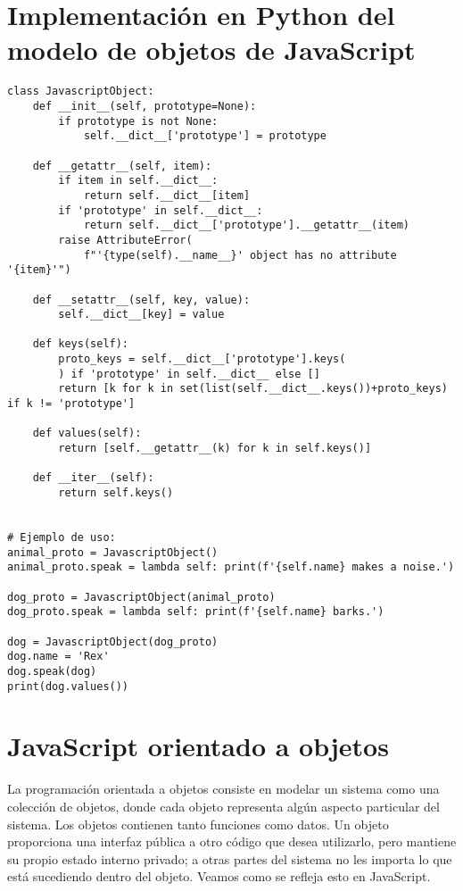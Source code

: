 \documentclass{article}
\begin{document}
\section{Implementación en Python del modelo de objetos de JavaScript}

\begin{lstlisting}
class JavascriptObject:
    def __init__(self, prototype=None):
        if prototype is not None:
            self.__dict__['prototype'] = prototype

    def __getattr__(self, item):
        if item in self.__dict__:
            return self.__dict__[item]
        if 'prototype' in self.__dict__:
            return self.__dict__['prototype'].__getattr__(item)
        raise AttributeError(
            f"'{type(self).__name__}' object has no attribute '{item}'")

    def __setattr__(self, key, value):
        self.__dict__[key] = value

    def keys(self):
        proto_keys = self.__dict__['prototype'].keys(
        ) if 'prototype' in self.__dict__ else []
        return [k for k in set(list(self.__dict__.keys())+proto_keys) if k != 'prototype']

    def values(self):
        return [self.__getattr__(k) for k in self.keys()]

    def __iter__(self):
        return self.keys()


# Ejemplo de uso:
animal_proto = JavascriptObject()
animal_proto.speak = lambda self: print(f'{self.name} makes a noise.')

dog_proto = JavascriptObject(animal_proto)
dog_proto.speak = lambda self: print(f'{self.name} barks.')

dog = JavascriptObject(dog_proto)
dog.name = 'Rex'
dog.speak(dog)
print(dog.values())
\end{lstlisting}

\section{JavaScript orientado a objetos}

La programación orientada a objetos consiste en modelar un sistema como una 
colección de objetos, donde cada objeto representa algún aspecto particular 
del sistema. Los objetos contienen tanto funciones como datos. 
Un objeto proporciona una interfaz pública a otro código que desea utilizarlo, 
pero mantiene su propio estado interno privado; a otras partes del sistema 
no les importa lo que está sucediendo dentro del objeto. Veamos como se 
refleja esto en JavaScript.
\end{document}
